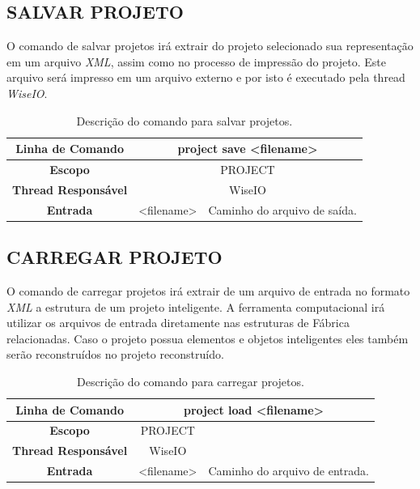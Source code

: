 \documentclass[a4paper,12pt]{monografia}
\theoremstyle{plain}
\theoremstyle{definition}
\theoremstyle{remark}
\begin{document}
\subsection{SALVAR PROJETO}\label{sec:save_projects}

O comando de salvar projetos irá extrair do projeto selecionado sua representação em um arquivo \textit{XML}, assim como no processo de impressão do projeto. Este arquivo será impresso em um arquivo externo e por isto é executado pela thread \textit{WiseIO}.

\begin{center}
	\begin{table}[!htbp]
		\begin{tabular}{|c|c|m{}|}
			\hline
			\textbf{Linha de Comando} & \multicolumn{2}{c|}{project save <file\underline{\space\space}name>} \\
			\hline
			\textbf{Escopo} & \multicolumn{2}{c|}{PROJECT} \\
			\hline
			\textbf{Thread Responsável} & \multicolumn{2}{c|}{WiseIO} \\
			\hline
			\textbf{Entrada} & <file\underline{\space\space}name> & Caminho do arquivo de saída. \\
			\hline
		\end{tabular}
		\caption{Descrição do comando para salvar projetos.}
		\label{tab:save_project}
	\end{table}
\end{center}

\subsection{CARREGAR PROJETO}\label{sec:load_projects}

O comando de carregar projetos irá extrair de um arquivo de entrada no formato \textit{XML} a estrutura de um projeto inteligente. A ferramenta computacional irá utilizar os arquivos de entrada diretamente nas estruturas de Fábrica relacionadas. Caso o projeto possua elementos e objetos inteligentes eles também serão reconstruídos no projeto reconstruído.
 
\begin{center}
	\begin{table}[!htbp]
		\begin{tabular}{|c|c|m{}|}
			\hline
			\textbf{Linha de Comando} & \multicolumn{2}{c|}{project load <filename>} \\
			\hline
			\textbf{Escopo} & \multicolumn{1}{c|}{PROJECT} \\
			\hline
			\textbf{Thread Responsável} & \multicolumn{1}{c|}{WiseIO} \\
			\hline
			\textbf{Entrada} & <filename> & Caminho do arquivo de entrada. \\
			\hline
		\end{tabular}
		\caption{Descrição do comando para carregar projetos.}
		\label{tab:load_project}
	\end{table}
\end{center}
\end{document}
